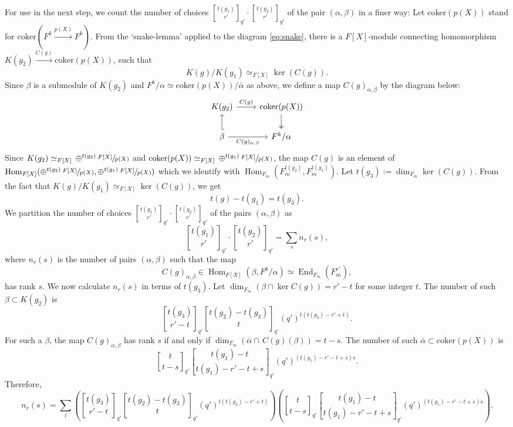 \documentclass[reqno]{amsart}
\theoremstyle{definition}
\theoremstyle{remark}
\numberwithin{equation}{section}
\newcommand{\stirling}[2]{\genfrac{[}{]}{0pt}{1}{#1}{#2}}
\DeclareMathOperator{\Hom}{Hom}
\DeclareMathOperator{\End}{End}
\begin{document}
For use in the next step, we count the number of choices $\stirling{t(g_1)}{r'}_{q'} \cdot \stirling{t(g_2)}{r'}_{q'}$ of the pair $(\alpha, \beta)$ in a finer way:   Let coker$(p(X))$ stand for $\text{coker}(F^k\xrightarrow{p(X)}F^k)$. From the `snake-lemma' applied to the diagram \eqref{eq:snake}, there is a $F[X]$-module connecting homomorphism $K(g_2) \xrightarrow{C(g)} \text{coker}(p(X))$, such that 
\[ K(g)/K(g_1) \simeq_{F[X]}   \ker(C(g)).\]
Since $\beta$ is a submodule of $K(g_2)$ and $F^k/\alpha \simeq \text{coker}(p(X))/\bar{\alpha}$ as above, we define a map $C(g)_{\alpha,\beta}$ by the diagram below:
\[ 
\begin{tikzcd}
K(g_2) 
  \arrow[r, "C(g)"] 
& \text{coker}(p(X))
  \arrow[d, twoheadrightarrow]
\\
\beta \arrow[r, "C(g)_{\alpha, \beta}"'] \arrow[u,hook']
&
F^k/\alpha
\end{tikzcd}
\]
Since $K(g_2) \simeq_{F[X]} \,   \oplus^{t(g_2)} \, \sfrac{F[X]}{p(X)}$ 
 and $\text{coker}(p(X)) \simeq_{F[X]} \,   \oplus^{t(g_1)} \, \sfrac{F[X]}{p(X)}$, the map $C(g)$ is an element of $\Hom_{F[X]}(\oplus^{t(g_2)} \, \sfrac{F[X]}{p(X)}, \oplus^{t(g_1)} \, \sfrac{F[X]}{p(X)})$ which we identify with $\Hom_{F_m}(F_m^{t(g_2)}, F_m^{t(g_1)})$. Let $t(g_3):=\dim_{F_m}\ker(C(g))$. From the fact that $K(g)/K(g_1) \simeq_{F[X]} \ker(C(g))$, we get
 \[ t(g)-t(g_1)=t(g_3).\]
We partition the number of choices $\stirling{t(g_1)}{r'}_{q'} \cdot \stirling{t(g_2)}{r'}_{q'}$ of the pairs $(\alpha, \beta)$ as 
\[ \stirling{t(g_1)}{r'}_{q'} \cdot \stirling{t(g_2)}{r'}_{q'}
 = \sum_s n_r(s),
\]
where $n_r(s)$ is the number of pairs $(\alpha, \beta)$ such  that the map 
\[ C(g)_{\alpha, \beta} \in \Hom_{F[X]}(\beta, F^k/\alpha) \simeq \End_{F_m}(F_m^{r'}), \]
has rank $s$.  We now calculate $n_r(s)$ in terms of $t(g_3)$. Let $\dim_{F_m}( \beta \cap \ker C(g))=r'-t$ for some integer $t$. The number of such $\beta \subset K(g_2)$ is 
\[ \stirling{t(g_3)}{r'-t}_{q'} \stirling{t(g_2)-t(g_3)}{t}_{q'} (q')^{t(t(g_3)-r'+t)}.\] For such a $\beta$, the map $C(g)_{\alpha, \beta}$ has rank $s$ if and only if $\dim_{F_m}(\bar\alpha \cap \, C(g)(\beta))=t-s$. The number of such $\bar\alpha \subset \text{coker}(p(X))$  is 
\[ \stirling{t}{t-s}_{q'} \stirling{t(g_1)-t}{t(g_1)-r'-t+s}_{q'}  (q')^{(t(g_1)-r'-t+s)s}.\]
Therefore, 
\begin{equation} \label{eq:n_r_s}
     n_r(s)=\sum_t \left(\stirling{t(g_3)}{r'-t}_{q'} \stirling{t(g_2)-t(g_3)}{t}_{q'} (q')^{t(t(g_3)-r'+t)} \right) \left( \stirling{t}{t-s}_{q'} \stirling{t(g_1)-t}{t(g_1)-r'-t+s}_{q'}  (q')^{(t(g_1)-r'-t+s)s}\right).     
\end{equation}
\end{document}
